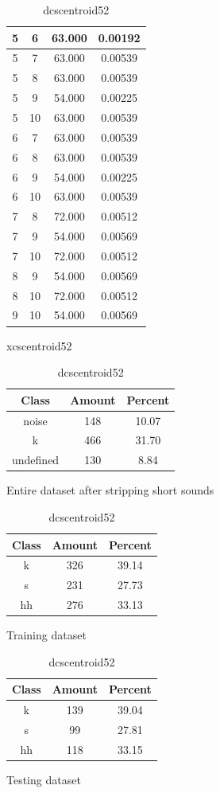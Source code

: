 \begin{table}
\begin{subtable}[h]{0.45\textwidth}
{\begin{tabular}{|c|c|c|c|}
 5 & 6 & 63.000 & 0.00192\\ \hline 
 5 & 7 & 63.000 & 0.00539\\ \hline 
 5 & 8 & 63.000 & 0.00539\\ \hline 
 5 & 9 & 54.000 & 0.00225\\ \hline 
 5 & 10 & 63.000 & 0.00539\\ \hline 
 6 & 7 & 63.000 & 0.00539\\ \hline 
 6 & 8 & 63.000 & 0.00539\\ \hline 
 6 & 9 & 54.000 & 0.00225\\ \hline 
 6 & 10 & 63.000 & 0.00539\\ \hline 
 7 & 8 & 72.000 & 0.00512\\ \hline 
 7 & 9 & 54.000 & 0.00569\\ \hline 
 7 & 10 & 72.000 & 0.00512\\ \hline 
 8 & 9 & 54.000 & 0.00569\\ \hline 
 8 & 10 & 72.000 & 0.00512\\ \hline 
 9 & 10 & 54.000 & 0.00569\\ \hline 

\end{tabular}
}\label{xlscentroid52}
\caption{xcscentroid52}
\end{subtable}

\begin{subtable}[h]{0.45\textwidth}
\centering
\begin{tabular}{|c|c|c|}
\hline
Class & Amount & Percent\\ \hline
noise & 148 & 10.07\\ \hline
k & 466 & 31.70\\ \hline
undefined & 130 & 8.84\\ \hline
\end{tabular}
\caption{Entire dataset after stripping short sounds}
\end{subtable}
\hfill
\begin{subtable}[h]{0.45\textwidth}
\centering
\begin{tabular}{|c|c|c|}
\hline
Class & Amount & Percent\\ \hline
k & 326 & 39.14\\ \hline
s & 231 & 27.73\\ \hline
hh & 276 & 33.13\\ \hline
\end{tabular}
\caption{Training dataset}
\end{subtable}
\hfill
\begin{subtable}[h]{0.45\textwidth}
\centering
\begin{tabular}{|c|c|c|}
\hline
Class & Amount & Percent\\ \hline
k & 139 & 39.04\\ \hline
s & 99 & 27.81\\ \hline
hh & 118 & 33.15\\ \hline
\end{tabular}
\caption{Testing dataset}
\end{subtable}
\hfill

\label{dlscentroid52}

\caption{dcscentroid52}

\end{table}\clearpage

